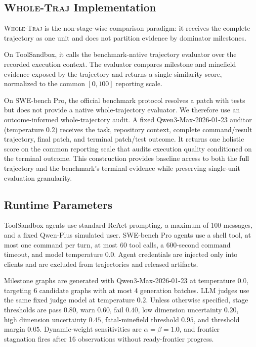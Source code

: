 \subsection{\textsc{Whole-Traj} Implementation}
\label{app:whole_traj_details}

\textsc{Whole-Traj} is the non-stage-wise comparison paradigm: it receives the complete trajectory as one unit and does not partition evidence by dominator milestones.

On ToolSandbox, it calls the benchmark-native trajectory evaluator over the recorded execution context. The evaluator compares milestone and minefield evidence exposed by the trajectory and returns a single similarity score, normalized to the common $[0,100]$ reporting scale.

On SWE-bench Pro, the official benchmark protocol resolves a patch with tests but does not provide a native whole-trajectory evaluator. We therefore use an outcome-informed whole-trajectory audit. A fixed Qwen3-Max-2026-01-23 auditor (temperature $0.2$) receives the task, repository context, complete command/result trajectory, final patch, and terminal patch/test outcome. It returns one holistic score on the common reporting scale that audits execution quality conditioned on the terminal outcome. This construction provides baseline access to both the full trajectory and the benchmark's terminal evidence while preserving single-unit evaluation granularity.

\subsection{Runtime Parameters}
\label{app:runtime_parameters}

ToolSandbox agents use standard ReAct prompting, a maximum of 100 messages, and a fixed Qwen-Plus simulated user. SWE-bench Pro agents use a shell tool, at most one command per turn, at most 60 tool calls, a 600-second command timeout, and model temperature $0.0$. Agent credentials are injected only into clients and are excluded from trajectories and released artifacts.

Milestone graphs are generated with Qwen3-Max-2026-01-23 at temperature $0.0$, targeting 6 candidate graphs with at most 4 generation batches. 
LLM judges use the same fixed judge model at temperature $0.2$. 
Unless otherwise specified, stage thresholds are pass $0.80$, warn $0.60$, fail $0.40$, low dimension uncertainty $0.20$, high dimension uncertainty $0.45$, fatal-minefield threshold $0.95$, and threshold margin $0.05$. 
Dynamic-weight sensitivities are $\alpha=\beta=1.0$, and frontier stagnation fires after 16 observations without ready-frontier progress.

